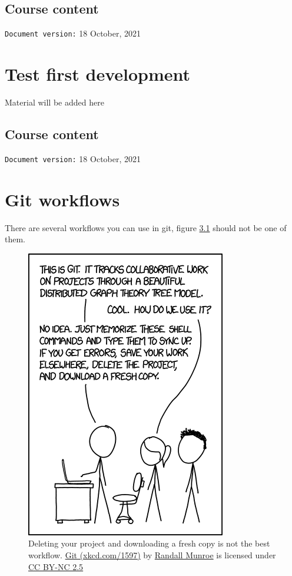 \documentclass[
]{book}
\begin{document}
\hypertarget{course-content}{%
\section{Course content}\label{course-content}}

\texttt{Document\ version:} 18 October, 2021

\hypertarget{testing}{%
\chapter{Test first development}\label{testing}}

Material will be added here

\hypertarget{course-content-1}{%
\section{Course content}\label{course-content-1}}

\texttt{Document\ version:} 18 October, 2021

\hypertarget{flowing}{%
\chapter{Git workflows}\label{flowing}}

There are several workflows you can use in git, figure \ref{fig:xkcd-git-fig} should not be one of them.

\begin{figure}

{\centering \includegraphics[width=0.55\linewidth]{images/git} 

}

\caption{Deleting your project and downloading a fresh copy is not the best workflow. \href{https://xkcd.com/1597/}{Git (xkcd.com/1597)} by \href{https://en.wikipedia.org/wiki/Randall_Munroe}{Randall Munroe} is licensed under \href{https://creativecommons.org/licenses/by-nc/2.5/}{CC BY-NC 2.5}}\label{fig:xkcd-git-fig}
\end{figure}
\end{document}
